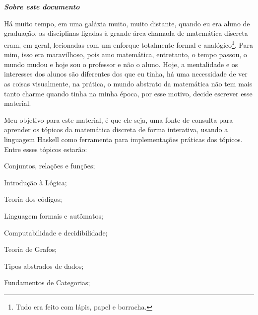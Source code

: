 \begingroup

\newpage \thispagestyle{empty} \
\newpage

\thispagestyle{empty}
\begin{center}
	{\normalfont\fontsize{20}{20}\sffamily\selectfont {\color{NordAurora5}\faLightbulb} \\ \textbf{\textit{Sobre este documento}}}\par
\end{center}

\vspace{0.75cm}


Há muito tempo, em uma galáxia muito, muito distante, quando eu era aluno de graduação, as disciplinas ligadas à grande área chamada de matemática discreta eram, em geral, lecionadas com um enforque totalmente formal e analógico\footnote{Tudo era feito com lápis, papel e borracha.}. Para mim, isso era maravilhoso, pois amo matemática, entretanto, o tempo passou, o mundo mudou e hoje sou o professor e não o aluno. Hoje, a mentalidade e os interesses dos alunos são diferentes dos que eu tinha, há uma necessidade de ver as coisas visualmente, na prática, o mundo abstrato da matemática não tem mais tanto charme quando tinha na minha época, por esse motivo, decide escrever esse material.

Meu objetivo para este material, é que ele seja, uma fonte de consulta para aprender os tópicos da matemática discreta de forma interativa, usando a linguagem Haskell como ferramenta para implementações práticas dos tópicos. Entre esses tópicos estarão:



\begin{multicols}{2}
	\begin{fieldsList}
		\item Conjuntos, relações e funções;
		\item Introdução à Lógica;
		\item Teoria dos códigos;
		\item Linguagem formais e autômatos;
		\item Computabilidade e decidibilidade;
		\item Teoria de Grafos;
    \item Tipos abstrados de dados; 
		\item Fundamentos de Categorias;
	\end{fieldsList}
\end{multicols}	

